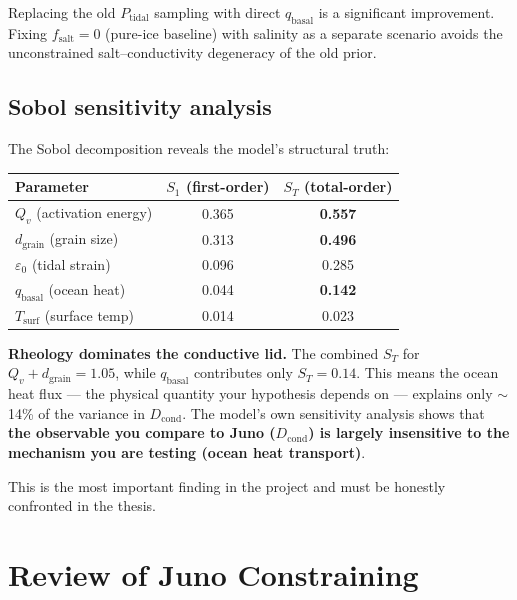 \documentclass[11pt,a4paper]{article}
\begin{document}
\begin{strength}
Replacing the old $P_\mathrm{tidal}$ sampling with direct $q_\mathrm{basal}$
is a significant improvement. Fixing $f_\mathrm{salt} = 0$ (pure-ice
baseline) with salinity as a separate scenario avoids the unconstrained
salt--conductivity degeneracy of the old prior.
\end{strength}

\subsection{Sobol sensitivity analysis}

The Sobol decomposition reveals the model's structural truth:

\begin{center}
\begin{tabular}{lcc}
\toprule
\textbf{Parameter} & $S_1$ (first-order) & $S_T$ (total-order) \\
\midrule
$Q_v$ (activation energy) & 0.365 & \textbf{0.557} \\
$d_\mathrm{grain}$ (grain size) & 0.313 & \textbf{0.496} \\
$\varepsilon_0$ (tidal strain) & 0.096 & 0.285 \\
$q_\mathrm{basal}$ (ocean heat) & 0.044 & \textbf{0.142} \\
$T_\mathrm{surf}$ (surface temp) & 0.014 & 0.023 \\
\bottomrule
\end{tabular}
\end{center}

\begin{critical}
\textbf{Rheology dominates the conductive lid.} The combined $S_T$ for
$Q_v + d_\mathrm{grain} = 1.05$, while $q_\mathrm{basal}$ contributes
only $S_T = 0.14$. This means the ocean heat flux --- the physical quantity
your hypothesis depends on --- explains only $\sim$14\% of the variance in
$D_\mathrm{cond}$. The model's own sensitivity analysis shows that
\textbf{the observable you compare to Juno ($D_\mathrm{cond}$) is largely
insensitive to the mechanism you are testing (ocean heat transport)}.

This is the most important finding in the project and must be honestly
confronted in the thesis.
\end{critical}

\section{Review of Juno Constraining}
\end{document}
